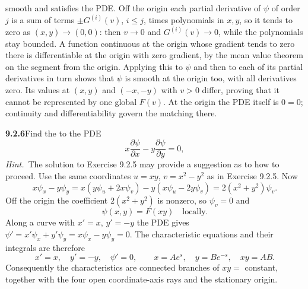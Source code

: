smooth and satisfies the PDE.  Off the origin each partial derivative
of $\psi$ of order $j$ is a sum of terms $\pm G^{(i)}(v)$, $i\le j$,
times polynomials in $x,y$, so it tends to zero as $(x,y)\to(0,0)$:
then $v\to0$ and $G^{(i)}(v)\to0$, while the polynomials stay bounded.
A function continuous at the origin whose gradient tends to zero there
is differentiable at the origin with zero gradient, by the mean value
theorem on the segment from the origin.  Applying this to $\psi$ and
then to each of its partial derivatives in turn shows that $\psi$ is
smooth at the origin too, with all derivatives zero.  Its values at
$(x,y)$ and $(-x,-y)$ with $v>0$ differ, proving that it cannot be
represented by one global $F(v)$.  At the origin the PDE itself is
$0=0$; continuity and differentiability govern the matching there.


\par\bigskip
\noindent\textbf{9.2.6}\quad Find the  to the PDE
\[
x\frac{\partial\psi}{\partial x}-y\frac{\partial\psi}{\partial y}=0,
\]
\emph{Hint.}~The solution to Exercise 9.2.5 may provide a suggestion as to how
to proceed.
\solution
Use the same coordinates $u=xy$, $v=x^2-y^2$ as in Exercise 9.2.5.
Now
\[
x\psi_x-y\psi_y
=x(y\psi_u+2x\psi_v)-y(x\psi_u-2y\psi_v)
=2(x^2+y^2)\psi_v.
\]
Off the origin the coefficient $2(x^2+y^2)$ is nonzero, so $\psi_v=0$
and
\[
\boxed{\psi(x,y)=F(xy)\quad\text{locally}}.
\]
Along a curve with $x'=x$, $y'=-y$ the PDE gives
$\psi'=x'\psi_x+y'\psi_y=x\psi_x-y\psi_y=0$.  The characteristic
equations and their integrals are therefore
\[
x'=x,\quad y'=-y,\quad\psi'=0,
\qquad x=Ae^s,\quad y=Be^{-s},\quad xy=AB.
\]
Consequently the characteristics are connected branches of $xy=$
constant, together with the four open coordinate-axis rays and the
stationary origin.


